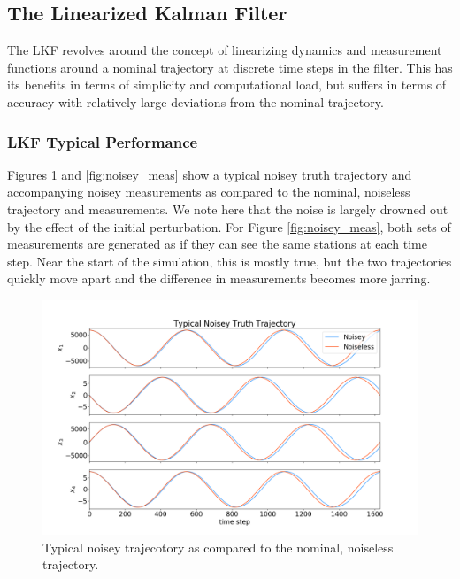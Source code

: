\documentclass[11pt, a4paper]{article}
\begin{document}
\subsection{The Linearized Kalman Filter}
\label{sec: LKF}
The LKF revolves around the concept of linearizing dynamics and measurement functions around a nominal trajectory at discrete time steps in the filter. 
This has its benefits in terms of simplicity and computational load, but suffers in terms of accuracy with relatively large deviations from the nominal trajectory. 

\subsubsection{LKF Typical Performance}
Figures \ref{fig:noisey_states} and \ref{fig:noisey_meas} show a typical noisey truth trajectory and accompanying noisey measurements as compared to the nominal, noiseless trajectory and measurements. 
We note here that the noise is largely drowned out by the effect of the initial perturbation. 
For Figure \ref{fig:noisey_meas}, both sets of measurements are generated as if they can see the same stations at each time step. 
Near the start of the simulation, this is mostly true, but the two trajectories quickly move apart and the difference in measurements becomes more jarring.

\begin{figure}[H]
	\centering
	\includegraphics[width=\textwidth]{Figures/noisey_truth.png}
	\caption{Typical noisey trajecotory as compared to the nominal, noiseless trajectory.}
	\label{fig:noisey_states}
\end{figure}
\end{document}
